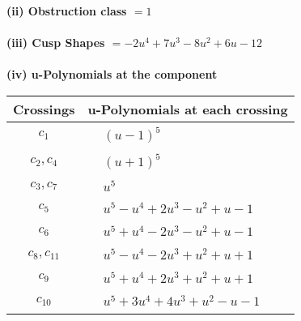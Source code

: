 \documentclass[1p]{elsarticle_modified}
\theoremstyle{definition}
\begin{document}
\flushleft \textbf{(ii) Obstruction class $= 1$}\\~\\
\flushleft \textbf{(iii) Cusp Shapes $= -2 u^4+7 u^3-8 u^2+6 u-12$}\\~\\
\newpage\renewcommand{\arraystretch}{1}
\flushleft \textbf{(iv) u-Polynomials at the component}\newline \\
\begin{tabular}{m{50pt}|m{274pt}}
Crossings & \hspace{64pt}u-Polynomials at each crossing \\
\hline $$\begin{aligned}c_{1}\end{aligned}$$&$\begin{aligned}
&(u-1)^5
\end{aligned}$\\
\hline $$\begin{aligned}c_{2},c_{4}\end{aligned}$$&$\begin{aligned}
&(u+1)^5
\end{aligned}$\\
\hline $$\begin{aligned}c_{3},c_{7}\end{aligned}$$&$\begin{aligned}
&u^5
\end{aligned}$\\
\hline $$\begin{aligned}c_{5}\end{aligned}$$&$\begin{aligned}
&u^5- u^4+2 u^3- u^2+u-1
\end{aligned}$\\
\hline $$\begin{aligned}c_{6}\end{aligned}$$&$\begin{aligned}
&u^5+u^4-2 u^3- u^2+u-1
\end{aligned}$\\
\hline $$\begin{aligned}c_{8},c_{11}\end{aligned}$$&$\begin{aligned}
&u^5- u^4-2 u^3+u^2+u+1
\end{aligned}$\\
\hline $$\begin{aligned}c_{9}\end{aligned}$$&$\begin{aligned}
&u^5+u^4+2 u^3+u^2+u+1
\end{aligned}$\\
\hline $$\begin{aligned}c_{10}\end{aligned}$$&$\begin{aligned}
&u^5+3 u^4+4 u^3+u^2- u-1
\end{aligned}$\\
\hline
\end{tabular}\\~\\
\end{document}

